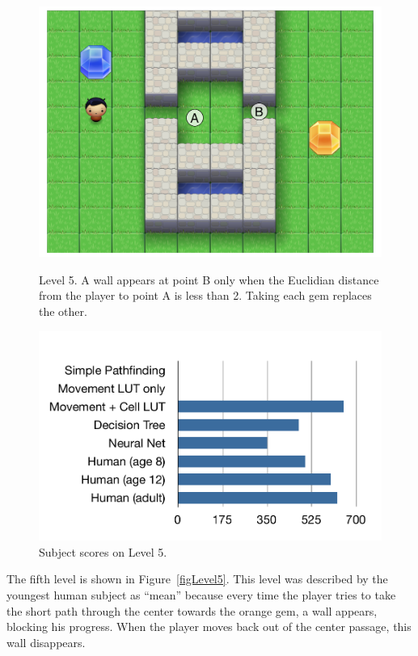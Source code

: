 \documentclass{article}
\begin{document}
\begin{figure}[ht]
\begin{minipage}[t]{0.45\linewidth}
\centering
\includegraphics[width=\textwidth]{figLevel5.pdf}
\caption{Level 5.  A wall appears at point B only when the Euclidian distance from the player to point A is less than 2.  Taking each gem replaces the other.}
\label{figLevel5}
\end{minipage}
\hspace{0.5cm}
\begin{minipage}[b]{0.45\linewidth}
\centering
\includegraphics[width=\textwidth]{figScores5.pdf}
\caption{Subject scores on Level 5.}
\label{figScores5}
\end{minipage}
\end{figure}

The fifth level is shown in Figure~\ref{figLevel5}.  This level was described by the youngest human subject as ``mean'' because every time the player tries to take the short path through the center towards the orange gem, a wall appears, blocking his progress.  When the player moves back out of the center passage, this wall disappears.
\end{document}

